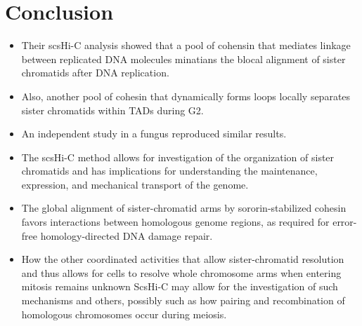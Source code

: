 \documentclass[plain,basic]{inVerba-notes}
\begin{document}
\section{Conclusion}
\begin{itemize}
    \item Their scsHi-C analysis showed that a pool of cohensin that mediates linkage between replicated DNA molecules minatians the blocal alignment of sister chromatids after DNA replication.
    \item Also, another pool of cohesin that dynamically forms loops locally separates sister chromatids within TADs during G2.
    \item An independent study in a fungus reproduced similar results.
    \item The scsHi-C method allows for investigation of the organization of sister chromatids and has implications for understanding the maintenance, expression, and mechanical transport of the genome.
    \item The global alignment of sister-chromatid arms by sororin-stabilized cohesin favors interactions between homologous genome regions, as required for error-free homology-directed DNA damage repair.
    \item How the other coordinated activities that allow sister-chromatid resolution and thus allows for cells to resolve whole chromosome arms when entering mitosis remains unknown ScsHi-C may allow for the investigation of such mechanisms and others, possibly such as how pairing and recombination of homologous chromosomes occur during meiosis. 
\end{itemize}

\nocite{mitter2020conformation}


\end{document}
